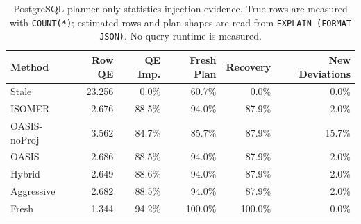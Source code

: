 \begin{table}[t]
  \centering
  \small
  \caption{PostgreSQL planner-only statistics-injection evidence. True rows are measured with \texttt{COUNT(*)}; estimated rows and plan shapes are read from \texttt{EXPLAIN (FORMAT JSON)}. No query runtime is measured.}
  \label{tab:postgres_planner_stats_injection}
  \setlength{\tabcolsep}{4pt}
  \begin{tabular}{lrrrrr}
    \toprule
    Method & Row QE & QE Imp. & Fresh Plan & Recovery & New Deviations \\
    \midrule
    Stale & 23.256 & 0.0\% & 60.7\% & 0.0\% & 0.0\% \\
    ISOMER & 2.676 & 88.5\% & 94.0\% & 87.9\% & 2.0\% \\
    OASIS-noProj & 3.562 & 84.7\% & 85.7\% & 87.9\% & 15.7\% \\
    OASIS & 2.686 & 88.5\% & 94.0\% & 87.9\% & 2.0\% \\
    Hybrid & 2.649 & 88.6\% & 94.0\% & 87.9\% & 2.0\% \\
    Aggressive & 2.682 & 88.5\% & 94.0\% & 87.9\% & 2.0\% \\
    Fresh & 1.344 & 94.2\% & 100.0\% & 100.0\% & 0.0\% \\
    \bottomrule
  \end{tabular}
\end{table}
